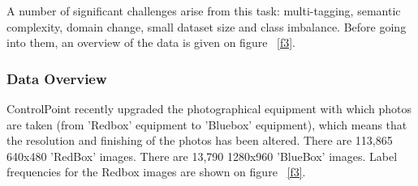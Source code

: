 \documentclass[a4paper,11pt]{article}
\begin{document}
A number of significant challenges arise from this task: multi-tagging, semantic complexity, domain change, small dataset size and class imbalance. Before going into them, an overview of the data is given on figure ~\ref{f3}. \\

\subsubsection{Data Overview}


ControlPoint recently upgraded the photographical equipment with which photos are taken (from 'Redbox' equipment to 'Bluebox' equipment), which means that the resolution and finishing of the photos has been altered. There are 113,865 640x480 'RedBox' images. There are 13,790 1280x960 'BlueBox' images. Label frequencies for the Redbox images are shown on figure ~\ref{f3}.
\end{document}
